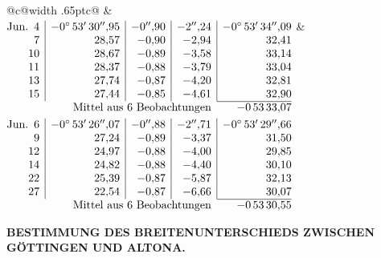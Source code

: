\noindent\begin{tabular}{@{}c@{\hspace{.4em}\vrule width .65pt\hspace{.4em}}c@{}}
 &
 \\[.18ex]
\(\begin{array}[t]{@{}r|r|r|r|r@{}}
\text{Jun.}\enspace 4 & -0^\circ\,53'\,30''{,}95 & -0''{,}90 & -2''{,}24 & -0^\circ\,53'\,34''{,}09\\
7 & 28{,}57 & -0{,}90 & -2{,}94 & 32{,}41\\
10 & 28{,}67 & -0{,}89 & -3{,}58 & 33{,}14\\
11 & 28{,}37 & -0{,}88 & -3{,}79 & 33{,}04\\
13 & 27{,}74 & -0{,}87 & -4{,}20 & 32{,}81\\
15 & 27{,}44 & -0{,}85 & -4{,}61 & 32{,}90\\
\cline{5-5}
\multicolumn{4}{r}{\text{Mittel aus 6 Beobachtungen}} & -0\,53\,33{,}07
\end{array}\)
&
\(\begin{array}[t]{@{}r|r|r|r|r@{}}
\text{Jun.}\enspace 6 & -0^\circ\,53'\,26''{,}07 & -0''{,}88 & -2''{,}71 & -0^\circ\,53'\,29''{,}66\\
9 & 27{,}24 & -0{,}89 & -3{,}37 & 31{,}50\\
12 & 24{,}97 & -0{,}88 & -4{,}00 & 29{,}85\\
14 & 24{,}82 & -0{,}88 & -4{,}40 & 30{,}10\\
22 & 25{,}39 & -0{,}87 & -5{,}87 & 32{,}13\\
27 & 22{,}54 & -0{,}87 & -6{,}66 & 30{,}07\\
\cline{5-5}
\multicolumn{4}{r}{\text{Mittel aus 6 Beobachtungen}} & -0\,53\,30{,}55
\end{array}\)
\end{tabular}\par\medskip

\par\clearpage
\noindent{}\parbox[t]{\dimexpr\linewidth-24mm\relax}{\centering\scriptsize\bfseries BESTIMMUNG DES BREITENUNTERSCHIEDS ZWISCHEN GÖTTINGEN UND ALTONA.}\makebox[12mm][r]{}\par\medskip

